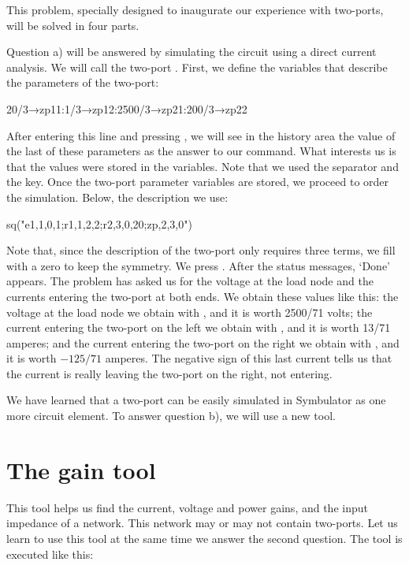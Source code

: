 This problem, specially designed to inaugurate our experience with
two-ports, will be solved in four parts.

Question a) will be answered by simulating the circuit using a
direct current analysis. We will call the two-port . First,
we define the variables that describe the parameters of the
two-port:

\begin{entry}
20/3→zp11:1/3→zp12:2500/3→zp21:200/3→zp22
\end{entry}

After entering this line and pressing , we will see in
the history area the value of the last of these parameters as the
answer to our command. What interests us is that the values were
stored in the variables. Note that we used the separator \code{:}
and the  key. Once the two-port parameter variables are
stored, we proceed to order the simulation. Below, the description
we use:

\begin{entry}
sq\dc("e1,1,0,1;r1,1,2,2;r2,3,0,20;zp,2,3,0")
\end{entry}

Note that, since the description of the two-port only requires three
terms, we fill with a zero to keep the symmetry. We press
. After the status messages, `Done' appears. The problem
has asked us for the voltage at the load node and the currents
entering the two-port at both ends. We obtain these values like
this: the voltage at the load node we obtain with , and it
is worth 2500/71 volts; the current entering the two-port on the
left we obtain with , and it is worth 13/71 amperes; and
the current entering the two-port on the right we obtain with
, and it is worth $-125/71$ amperes. The negative sign of
this last current tells us that the current is really leaving the
two-port on the right, not entering.

We have learned that a two-port can be easily simulated in
Symbulator as one more circuit element. To answer question b), we
will use a new tool.

\section{The gain tool}

This tool helps us find the current, voltage and power gains, and
the input impedance of a network. This network may or may not
contain two-ports. Let us learn to use this tool at the same time we
answer the second question. The  tool is executed like
this:

